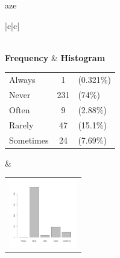  aze 
  \begin{center}
    \addtolength{\leftskip}{-4cm}\addtolength{\rightskip}{-4cm}
    \begin{tabular}{|c|c|}

      \hline
        \\
      \hline
        {\bf Frequency} & {\bf Histogram}  \\
          \begin{tabular}{@{}l@{ : }cl@{}}
            Always & 1 &(0.321\%) \\
            Never & 231 &(74\%) \\
            Often & 9 &(2.88\%) \\
            Rarely & 47 &(15.1\%) \\
            Sometimes & 24 &(7.69\%) \\
          \end{tabular}
      &
          \begin{tabular}{@{}l@{}}
            \includegraphics[width=3cm]{graphUniv/V13-barplot}
          \end{tabular}
      \\ \hline 

    \end{tabular}
  \end{center}
  
  



